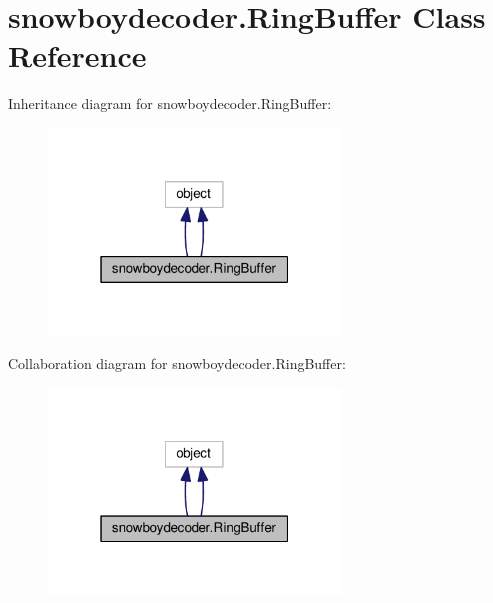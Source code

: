 \hypertarget{classsnowboydecoder_1_1RingBuffer}{}\section{snowboydecoder.\+Ring\+Buffer Class Reference}
\label{classsnowboydecoder_1_1RingBuffer}


Inheritance diagram for snowboydecoder.\+Ring\+Buffer\+:
\nopagebreak
\begin{figure}[H]
\begin{center}
\leavevmode
\includegraphics[width=220pt]{classsnowboydecoder_1_1RingBuffer__inherit__graph}
\end{center}
\end{figure}


Collaboration diagram for snowboydecoder.\+Ring\+Buffer\+:
\nopagebreak
\begin{figure}[H]
\begin{center}
\leavevmode
\includegraphics[width=220pt]{classsnowboydecoder_1_1RingBuffer__coll__graph}
\end{center}
\end{figure}
